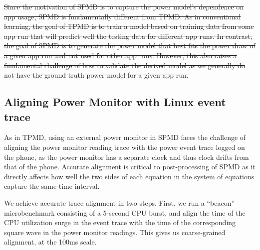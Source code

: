 \st{
Since the motivation of SPMD is to capture the power model's dependence on
app usage, SPMD is fundamentally different from 
TPMD.  As in conventional learning,
the goal of TPMD is to train a model based on training data from
some app run that will predict well the testing data for different
app runs.
In contrast, the goal of SPMD is to generate the power model that
best fits the power draw of a given app run and not used for other app runs.
However, this also raises a fundamental challenge of how to
validate the derived model as we generally do not have the
ground-truth power model for a given app run.}




\subsection{Aligning Power Monitor with Linux event trace}
\label{subsec:align}

As in TPMD, using an external power monitor in SPMD faces the challenge
of aligning the power monitor reading trace with the power event trace
logged on the phone, as the power monitor has a separate clock and
thus clock drifts from that of the phone. Accurate alignment is
critical to post-processing of SPMD as it directly affects how well the
two sides of each equation in the system of equations capture the same
time interval.

We achieve accurate trace alignment in two steps.  First, we run a
``beacon'' microbenchmark consisting of a 5-second CPU burst, and
align the time of the CPU utilization surge in the event trace with
the time of the corresponding square wave in the power monitor
readings. This gives us coarse-grained alignment, at the 100ms scale.

